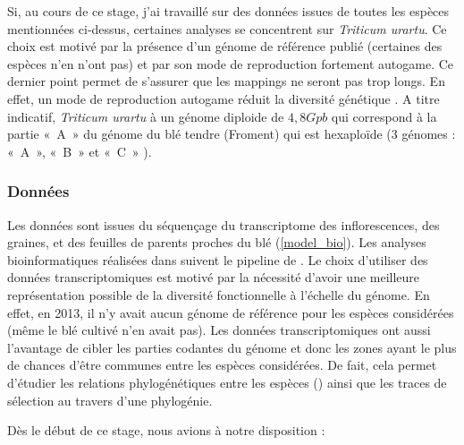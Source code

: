 \documentclass[../main]{subfiles} %
\begin{document}
Si, au cours de ce stage, j’ai travaillé sur des données issues de toutes les espèces mentionnées ci-dessus,  certaines  analyses se concentrent sur \textit{Triticum urartu}. Ce choix est motivé par la présence d'un génome de référence publié (certaines des espèces n'en n'ont pas) et par son mode de reproduction fortement \gls{autogame}. Ce dernier point permet de s'assurer que les \glspl{mapping} ne seront pas trop longs. En effet, un mode de reproduction \gls{autogame} réduit la diversité génétique \cite{burgarella_mating_2024}. A titre indicatif, \textit{Triticum urartu} à un génome \gls{diploide} de $4,8 Gpb$  qui correspond à la partie « A » du génome du blé tendre (Froment) qui est \gls{hexaploïde} (3 génomes : « A », « B » et « C »  \cite{noauthor_ble_2024}).


\subsubsection{Données}
\label{sec:donnees}



Les  données sont issues du \gls{séquençage} du \gls{transcriptome}
des \glspl{inflorescence}, des graines, et des feuilles de parents proches du blé (\cref{model_bio}). Les analyses bioinformatiques réalisées dans  \cite{burgarella_mating_2024} suivent le pipeline de \cite{sarah_large_2017}. 
Le choix d’utiliser des données \glspl{transcriptomique} est motivé par la nécessité d'avoir une meilleure représentation possible de la diversité fonctionnelle à l'échelle du génome. En effet, en 2013, il n'y avait aucun génome de référence pour les espèces considérées (même le blé cultivé n'en avait pas). Les données \glspl{transcriptomique} ont aussi l'avantage de cibler les parties codantes du génome et donc les zones ayant le plus de chances d’être communes entre les espèces considérées. De fait, cela permet d’étudier les relations phylogénétiques entre les espèces (\cite{glemin_pervasive_2019}) ainsi que les traces de sélection au travers d'une \gls{phylogénie}. 


Dès le début de ce stage, nous avions à notre disposition :
\end{document}

